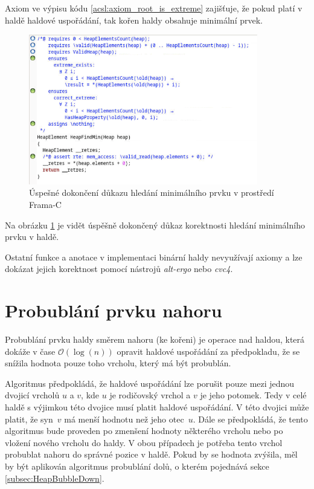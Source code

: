 Axiom ve výpisu kódu \ref{acsl:axiom_root_is_extreme} zajišťuje, že pokud platí v haldě haldové uspořádání, tak kořen haldy obsahuje minimální prvek.

\begin{figure}[H]
	\centering
	\includegraphics[width=10cm]{images/frama-c-HeapFindMin}
	\caption{Úspešné dokončení důkazu hledání minimálního prvku v prostředí Frama-C}
	\label{img:F-C-HeapFindMin}
\end{figure}

Na obrázku \ref{img:F-C-HeapFindMin} je vidět úspěšně dokončený důkaz korektnosti hledání minimálního prvku v haldě.

Ostatní funkce a anotace v implementaci binární haldy nevyužívají axiomy a lze dokázat jejich korektnost pomocí nástrojů \textit{alt-ergo} nebo \textit{cvc4}.

\section{Probublání prvku nahoru}
\label{subsec:HeapBubbleUp}

Probublání prvku haldy směrem nahoru (ke kořeni) je operace nad haldou, která dokáže v čase $\mathcal{O}(\log(n))$ opravit haldové uspořádání za předpokladu, že se snížila hodnota pouze toho vrcholu, který má být probublán.

Algoritmus předpokládá, že haldové uspořádání lze porušit pouze mezi jednou dvojicí vrcholů $u$ a $v$, kde $u$ je rodičovský vrchol a $v$ je jeho potomek. Tedy v celé haldě s výjimkou této dvojice musí platit haldové uspořádání. V této dvojici může platit, že syn~$v$ má menší hodnotu než jeho otec~$u$. Dále se předpokládá, že tento algoritmus bude proveden po zmenšení hodnoty některého vrcholu nebo po vložení nového vrcholu do haldy. V obou případech je potřeba tento vrchol probublat nahoru do správné pozice v haldě. Pokud by se hodnota zvýšila, měl by být aplikován algoritmus probublání dolů, o kterém pojednává sekce \ref{subsec:HeapBubbleDown}.

